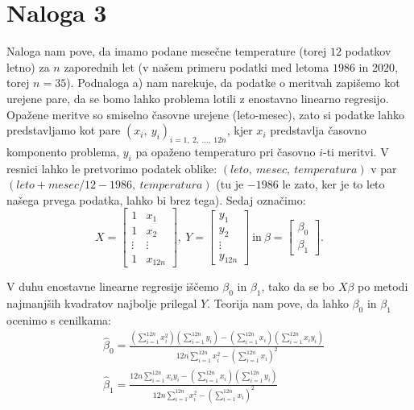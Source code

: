 \documentclass{article}
\begin{document}
\section{Naloga 3}
Naloga nam pove, da imamo podane mesečne temperature (torej $12$ podatkov letno) za $n$ zaporednih let (v našem primeru podatki med letoma $1986$ in $2020$, torej $n = 35$).
Podnaloga a) nam narekuje, da podatke o meritvah zapišemo kot urejene pare, da se bomo lahko problema lotili z enostavno linearno regresijo.
Opažene meritve so smiselno časovne urejene (leto-mesec), zato si podatke lahko predstavljamo kot pare $(x_i,~y_i)_{i=1,~2,~\dots,~12n}$, kjer $x_i$ predstavlja časovno komponento problema, $y_i$ pa opaženo temperaturo pri časovno $i$-ti meritvi. 
V resnici lahko le pretvorimo podatek oblike: $(leto,~mesec,~temperatura)$ v par $(leto + mesec/12 - 1986,~temperatura)$ (tu je $-1986$ le zato, ker je to leto našega prvega podatka, lahko bi brez tega).
Sedaj označimo: 
$$
    X = \begin{bmatrix}
        1 & x_1\\ 
        1 & x_2 \\
        \vdots & \vdots\\ 
        1 & x_{12n}
    \end{bmatrix}, ~
    Y = \begin{bmatrix}
        y_1 \\ 
        y_2 \\
        \vdots \\ 
        y_{12n}
    \end{bmatrix}~\text{in}~ 
    \beta = \begin{bmatrix}
        \beta_0 \\ 
        \beta_1
    \end{bmatrix}.   
$$

V duhu enostavne linearne regresije iščemo $\beta_0$ in $\beta_1$, tako da se bo $X \beta$ po metodi najmanjših kvadratov najbolje prilegal $Y$.
Teorija nam pove, da lahko $\beta_0$ in $\beta_1$ ocenimo s cenilkama:
$$
\begin{aligned}
& \hat{\beta}_{0}=\frac{\left(\sum_{i=1}^{12n} x_{i}^{2}\right)\left(\sum_{i=1}^{12n} y_{i}\right)-\left(\sum_{i=1}^{12n} x_{i}\right)\left(\sum_{i=1}^{12n} x_{i} y_{i}\right)}{12n \sum_{i=1}^{12n} x_{i}^{2}-\left(\sum_{i=1}^{12n} x_{i}\right)^{2}} \\
& \hat{\beta}_{1}=\frac{12n \sum_{i=1}^{12n} x_{i} y_{i}-\left(\sum_{i=1}^{12n} x_{i}\right)\left(\sum_{i=1}^{12n} y_{i}\right)}{12n \sum_{i=1}^{12n} x_{i}^{2}-\left(\sum_{i=1}^{12n} x_{i}\right)^{2}}
\end{aligned}
$$
\end{document}
